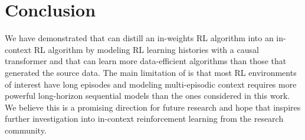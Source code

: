 \section{Conclusion}

We have demonstrated that \fullname can distill an in-weights RL algorithm into an in-context RL algorithm by modeling RL learning histories with a causal transformer and that \name can learn more data-efficient algorithms than those that generated the source data. The main limitation of \name is that most RL environments of interest have long episodes and modeling multi-episodic context requires more powerful long-horizon sequential models than the ones considered in this work. We believe this is a promising direction for future research and hope that \name inspires further investigation into in-context reinforcement learning from the research community. 